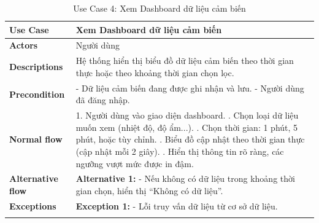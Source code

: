 \begin{longtable}{|p{}|p{}|}
    \hline
    \textbf{Use Case}         & Xem Dashboard dữ liệu cảm biến                                                                      \\
    \hline
    \textbf{Actors}           & Người dùng                                                                                          \\
    \hline
    \textbf{Descriptions}     & Hệ thống hiển thị biểu đồ dữ liệu cảm biến theo thời gian thực hoặc theo khoảng thời gian chọn lọc. \\
    \hline
    \textbf{Precondition}     &
    - Dữ liệu cảm biến đang được ghi nhận và lưu. \newline
    - Người dùng đã đăng nhập.                                                                                                      \\
    \hline
    \textbf{Normal flow}      &
    1. Người dùng vào giao diện dashboard. \newline
    2. Chọn loại dữ liệu muốn xem (nhiệt độ, độ ẩm...). \newline
    3. Chọn thời gian: 1 phút, 5 phút, hoặc tùy chỉnh. \newline
    4. Biểu đồ cập nhật theo thời gian thực (cập nhật mỗi 2 giây). \newline
    5. Hiển thị thông tin rõ ràng, các ngưỡng vượt mức được in đậm.                                                                 \\
    \hline
    \textbf{Alternative flow} &
    \textbf{Alternative 1:} \newline
    - Nếu không có dữ liệu trong khoảng thời gian chọn, hiển thị “Không có dữ liệu”.                                                \\
    \hline
    \textbf{Exceptions}       &
    \textbf{Exception 1:} \newline
    - Lỗi truy vấn dữ liệu từ cơ sở dữ liệu.                                                                                        \\
    \hline
    \caption{Use Case 4: Xem Dashboard dữ liệu cảm biến}
    \label{tab:usecase4}
\end{longtable}


